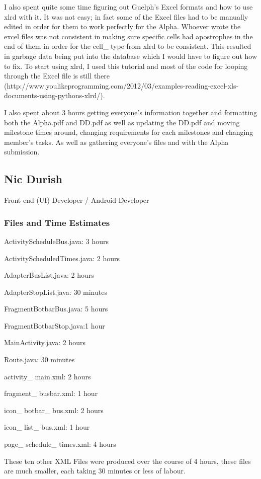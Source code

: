 \documentclass[a4paper,12pt]{article}
\begin{document}
I also spent quite some time figuring out Guelph's Excel formats and how to use xlrd with it. It was not easy; in fact some of the Excel files had to be manually edited in order for them to work perfectly for the Alpha. Whoever wrote the excel files was not consistent in making sure specific cells had apostrophes in the end of them in order for the cell\_ type from xlrd to be consistent. This resulted in garbage data being put into the database which I would have to figure out how to fix. To start using xlrd, I used this tutorial and most of the code for looping through the Excel file is still there (http://www.youlikeprogramming.com/2012/03/examples-reading-excel-xls-documents-using-pythons-xlrd/).

I also spent about 3 hours getting everyone's information together and formatting both the Alpha.pdf and DD.pdf as well as updating the DD.pdf and moving milestone times around, changing requirements for each milestones and changing member's tasks. As well as gathering everyone's files and with the Alpha submission.
\subsection{Nic Durish}
Front-end (UI) Developer / Android Developer
\subsubsection{Files and Time Estimates}
ActivityScheduleBus.java: 3 hours

ActivityScheduledTimes.java: 2 hours

AdapterBusList.java: 2 hours

AdapterStopList.java: 30 minutes

FragmentBotbarBus.java: 5 hours

FragmentBotbarStop.java:1 hour

MainActivity.java: 2 hours

Route.java: 30 minutes
	
activity\_ main.xml: 2 hours

fragment\_ busbar.xml: 1 hour

icon\_ botbar\_ bus.xml: 2 hours

icon\_ list\_ bus.xml: 1 hour

page\_ schedule\_ times.xml: 4 hours

These ten other XML Files were produced over the course of 4 hours, these files are much smaller, each taking 30 minutes or less of labour.
\end{document}
